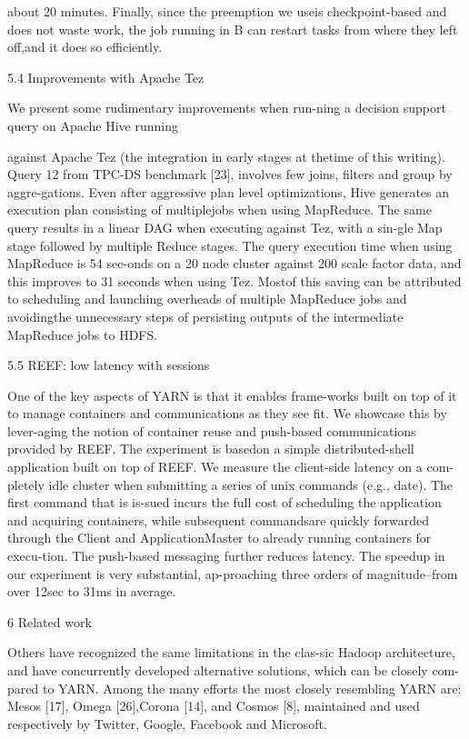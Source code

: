 about 20 minutes. Finally, since the preemption we useis checkpoint-based and does not waste work, the job
running in B can restart tasks from where they left off,and it does so efficiently.

5.4 Improvements with Apache Tez

We present some rudimentary improvements when run-ning a decision support query on Apache Hive running

against Apache Tez (the integration in early stages at thetime of this writing). Query 12 from TPC-DS benchmark [23], involves few joins, filters and group by aggre-gations. Even after aggressive plan level optimizations,
Hive generates an execution plan consisting of multiplejobs when using MapReduce. The same query results in
a linear DAG when executing against Tez, with a sin-gle Map stage followed by multiple Reduce stages. The
query execution time when using MapReduce is 54 sec-onds on a 20 node cluster against 200 scale factor data,
and this improves to 31 seconds when using Tez. Mostof this saving can be attributed to scheduling and launching overheads of multiple MapReduce jobs and avoidingthe unnecessary steps of persisting outputs of the intermediate MapReduce jobs to HDFS.

5.5 REEF: low latency with sessions

One of the key aspects of YARN is that it enables frame-works built on top of it to manage containers and communications as they see fit. We showcase this by lever-aging the notion of container reuse and push-based communications provided by REEF. The experiment is basedon a simple distributed-shell application built on top of
REEF. We measure the client-side latency on a com-pletely idle cluster when submitting a series of unix
commands (e.g., date). The first command that is is-sued incurs the full cost of scheduling the application
and acquiring containers, while subsequent commandsare quickly forwarded through the Client and ApplicationMaster to already running containers for execu-tion. The push-based messaging further reduces latency.
The speedup in our experiment is very substantial, ap-proaching three orders of magnitude--from over 12sec
to 31ms in average.

6 Related work

Others have recognized the same limitations in the clas-sic Hadoop architecture, and have concurrently developed alternative solutions, which can be closely com-pared to YARN. Among the many efforts the most
closely resembling YARN are: Mesos [17], Omega [26],Corona [14], and Cosmos [8], maintained and used respectively by Twitter, Google, Facebook and Microsoft.

